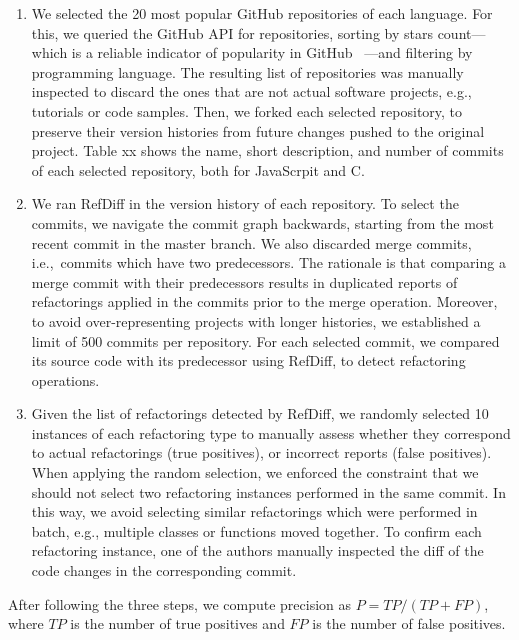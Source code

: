 \begin{enumerate}  
\item We selected the 20 most popular GitHub repositories of each language. For this, we queried the GitHub API for repositories, sorting by stars count---which is a reliable indicator of popularity in GitHub~\cite{icsme2016,jss-2018-github-stars} ---and filtering by programming language.
The resulting list of repositories was manually inspected to discard the ones that are not actual software projects, e.g., tutorials or code samples. Then, we forked each selected repository, to preserve their version histories from future changes pushed to the original project. Table xx shows the name, short description, and number of commits of each selected repository, both for JavaScrpit and C.  

\item We ran RefDiff in the version history of each repository. To select the commits, we navigate the commit graph backwards, starting from the most recent commit in the master branch. We also discarded merge commits, i.e.,~commits which have two predecessors. The rationale is that comparing a merge commit with their predecessors results in duplicated reports of refactorings applied in the commits prior to the merge operation. Moreover, to avoid over-representing projects with longer histories, we established a limit of 500 commits per repository. For each selected commit, we compared its source code with its predecessor using RefDiff, to detect refactoring operations.

\item Given the list of refactorings detected by RefDiff, we randomly selected 10 instances of each refactoring type to manually assess whether they correspond to actual refactorings (true positives), or incorrect reports (false positives).
When applying the random selection, we enforced the constraint that we should not select two refactoring instances performed in the same commit.
In this way, we avoid selecting similar refactorings which were performed in batch, e.g., multiple classes or functions moved together.
To confirm each refactoring instance, one of the authors manually inspected the diff of the code changes in the corresponding commit.
\end{enumerate}

After following the three steps, we compute precision as $P = \mathit{TP} / (\mathit{TP} + \mathit{FP})$, where $\mathit{TP}$ is the number of true positives and $\mathit{FP}$ is the number of false positives.



